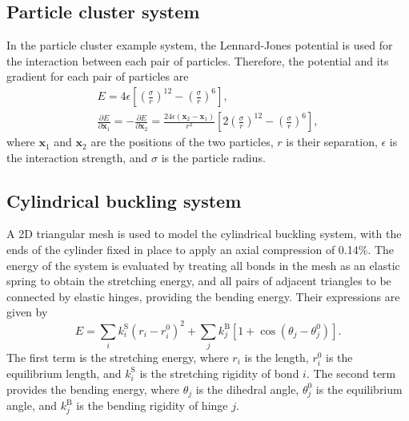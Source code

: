 \documentclass[aip,jcp,reprint,twocolumn]{revtex4-1}
\begin{document}
\subsection{Particle cluster system}
In the particle cluster example system, the Lennard-Jones potential is used for the interaction between each pair of particles.
Therefore, the potential and its gradient for each pair of particles are
\begin{gather}
  E = 4\epsilon \left[ \left(\frac{\sigma}{r}\right)^{12} - \left(\frac{\sigma}{r}\right)^6 \right], \\
  \frac{\partial E}{\partial \bm{x}_1} = -\frac{\partial E}{\partial \bm{x}_2} =
    \frac{24 \epsilon (\bm{x}_2 - \bm{x}_1)}{r^2} \left[ 2 \left(\frac{\sigma}{r}\right)^{12} - \left(\frac{\sigma}{r}\right)^6 \right],
\end{gather}
where $\bm{x}_1$ and $\bm{x}_2$ are the positions of the two particles, $r$ is their separation, $\epsilon$ is the interaction strength, and $\sigma$ is the particle radius.

\subsection{Cylindrical buckling system}
A 2D triangular mesh is used to model the cylindrical buckling system, with the ends of the cylinder fixed in place to apply an axial compression of 0.14\%.
The energy of the system is evaluated by treating all bonds in the mesh as an elastic spring to obtain the stretching energy, and all pairs of adjacent triangles to be connected by elastic hinges, providing the bending energy.
Their expressions are given by
\begin{equation}
  E = \sum_i k^\mathrm{S}_i (r_i - r^0_i)^2 + \sum_j k^\mathrm{B}_j [1 + \cos(\theta_j - \theta^0_j)].
\end{equation}
The first term is the stretching energy, where $r_i$ is the length, $r^0_i$ is the equilibrium length, and $k^\mathrm{S}_i$ is the stretching rigidity of bond $i$.
The second term provides the bending energy, where $\theta_j$ is the dihedral angle, $\theta^0_j$ is the equilibrium angle, and $k^\mathrm{B}_j$ is the bending rigidity of hinge $j$.
\end{document}
